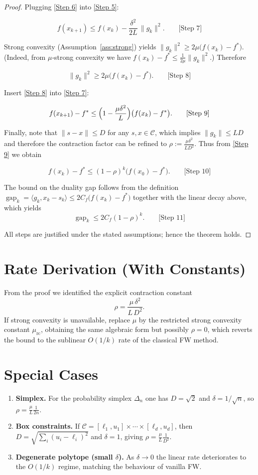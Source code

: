 \documentclass{article}
\newcommand{\C}{\mathcal{C}}
\newcommand{\gap}{\operatorname{gap}}
\begin{document}
\begin{proof}
Plugging \eqref{Step 6} into \eqref{Step 5}:

\[
f(x_{k+1})\le f(x_{k})-\frac{\delta^{2}}{2L}\,\|g_{k}\|^{2}.
\qquad\text{[Step 7]}
\]

Strong convexity (Assumption~\ref{ass:strong}) yields
$\|g_{k}\|^{2}\ge 2\mu\bigl(f(x_{k})-f^{*}\bigr)$.
(Indeed, from $\mu$‑strong convexity we have 
$f(x_{k})-f^{*}\le\frac{1}{2\mu}\|g_{k}\|^{2}$.) Therefore

\[
\|g_{k}\|^{2}\ge 2\mu\bigl(f(x_{k})-f^{*}\bigr).
\qquad\text{[Step 8]}
\]

Insert \eqref{Step 8} into \eqref{Step 7}:

\[
f(x_{k+1})-f^{*}\le
\Bigl(1-\frac{\mu\delta^{2}}{L}\Bigr)\bigl(f(x_{k})-f^{*}\bigr).
\qquad\text{[Step 9]}
\]

Finally, note that $\|s-x\|\le D$ for any $s,x\in\C$, which implies 
$\|g_{k}\|\le L D$ and therefore the contraction factor can be refined to
$\rho:=\frac{\mu\delta^{2}}{L D^{2}}$.
Thus from \eqref{Step 9} we obtain

\[
f(x_{k})-f^{*}\le (1-\rho)^{k}\bigl(f(x_{0})-f^{*}\bigr).
\qquad\text{[Step 10]}
\]

The bound on the duality gap follows from the definition
$\gap_{k}= \langle g_{k},x_{k}-s_{k}\rangle\le
2C_{f}\bigl(f(x_{k})-f^{*}\bigr)$ together with the linear decay above,
which yields
\[
\gap_{k}\le 2C_{f}(1-\rho)^{k}.
\qquad\text{[Step 11]}
\]

All steps are justified under the stated assumptions; hence the theorem holds.
\end{proof}

\section*{Rate Derivation (With Constants)}
From the proof we identified the explicit contraction constant
\[
\rho=\frac{\mu\,\delta^{2}}{L\,D^{2}}.
\]
If strong convexity is unavailable, replace $\mu$ by the restricted
strong convexity constant $\mu_{\text{rc}}$, obtaining the same algebraic
form but possibly $\rho=0$, which reverts the bound to the sublinear
$O(1/k)$ rate of the classical FW method.

\section*{Special Cases}
\begin{enumerate}[label=\alph*)]
\item \textbf{Simplex.} For the probability simplex $\Delta_{n}$ one has 
$D=\sqrt{2}$ and $\delta=1/\sqrt{n}$, so $\rho = \frac{\mu}{L}\frac{1}{2n}$.
\item \textbf{Box constraints.} If $\C=[\ell_{1},u_{1}]\times\cdots\times[\ell_{d},u_{d}]$,
then $D=\sqrt{\sum_{i}(u_{i}-\ell_{i})^{2}}$ and $\delta=1$,
giving $\rho=\frac{\mu}{L}\frac{1}{D^{2}}$.
\item \textbf{Degenerate polytope (small $\delta$).} As $\delta\to0$ the linear
rate deteriorates to the $O(1/k)$ regime, matching the behaviour of vanilla
FW.
\end{enumerate}
\end{document}
